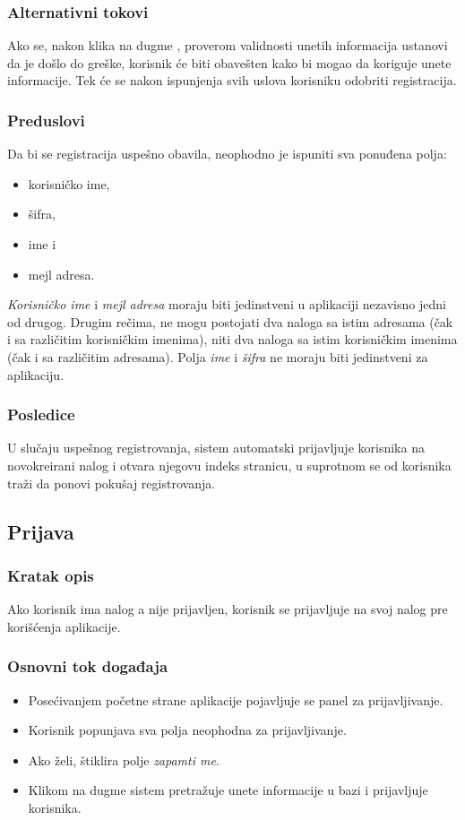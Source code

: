 \subsubsection{Alternativni tokovi}
Ako se, nakon klika na dugme , proverom validnosti unetih informacija ustanovi da je došlo do greške, korisnik će biti obavešten kako bi mogao da koriguje unete informacije.
Tek će se nakon ispunjenja svih uslova korisniku odobriti registracija.

\subsubsection{Preduslovi}
Da bi se registracija uspešno obavila, neophodno je ispuniti sva ponuđena polja:
\begin{itemize}
  \item korisničko ime, \item šifra, \item ime i \item mejl adresa.
\end{itemize}

\emph{Korisničko ime} i \emph{mejl adresa} moraju biti jedinstveni u aplikaciji nezavisno jedni od drugog.
Drugim rečima, ne mogu postojati dva naloga sa istim adresama (čak i sa različitim korisničkim imenima), niti dva naloga sa istim korisničkim imenima (čak i sa različitim adresama).
Polja \emph{ime} i \emph{šifra} ne moraju biti jedinstveni za aplikaciju.

\subsubsection{Posledice}
U slučaju uspešnog registrovanja, sistem automatski prijavljuje korisnika na novokreirani nalog i otvara njegovu indeks stranicu, u suprotnom se od korisnika traži da ponovi pokušaj registrovanja.


\subsection{Prijava}
\label{subsec:prijava}

\subsubsection{Kratak opis}
Ako korisnik ima nalog a nije prijavljen, korisnik se prijavljuje na svoj nalog pre korišćenja aplikacije.

\subsubsection{Osnovni tok događaja}
\begin{itemize}
  \item Posećivanjem početne strane aplikacije pojavljuje se panel za prijavljivanje.
  \item Korisnik popunjava sva polja neophodna za prijavljivanje.
  \item Ako želi, štiklira polje \emph{zapamti me}.
  \item Klikom na dugme  sistem pretražuje unete informacije u bazi i prijavljuje korisnika.
\end{itemize}


